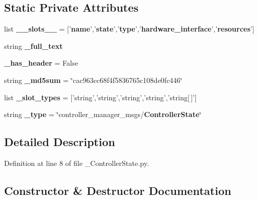 \subsection*{\-Static \-Private \-Attributes}
\begin{DoxyCompactItemize}
\item 
list {\bf \-\_\-\-\_\-slots\-\_\-\-\_\-} = ['{\bf name}','{\bf state}','{\bf type}','{\bf hardware\-\_\-interface}','{\bf resources}']
\item 
string {\bf \-\_\-full\-\_\-text}
\item 
{\bf \-\_\-has\-\_\-header} = \-False
\item 
string {\bf \-\_\-md5sum} = \char`\"{}cac963cc68f4f5836765c108de0fc446\char`\"{}
\item 
list {\bf \-\_\-slot\-\_\-types} = ['string','string','string','string','string[$\,$]']
\item 
string {\bf \-\_\-type} = \char`\"{}controller\-\_\-manager\-\_\-msgs/{\bf \-Controller\-State}\char`\"{}
\end{DoxyCompactItemize}


\subsection{\-Detailed \-Description}


\-Definition at line 8 of file \-\_\-\-Controller\-State.\-py.



\subsection{\-Constructor \& \-Destructor \-Documentation}
